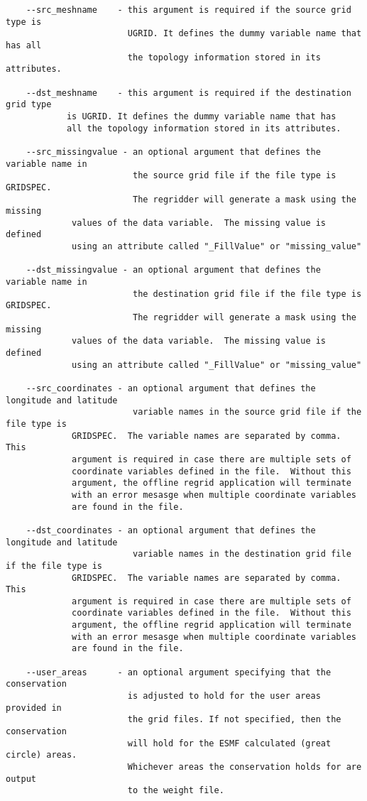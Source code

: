 \begin{verbatim}
    --src_meshname    - this argument is required if the source grid type is
                        UGRID. It defines the dummy variable name that has all 
                        the topology information stored in its attributes.

    --dst_meshname    - this argument is required if the destination grid type 
			is UGRID. It defines the dummy variable name that has 
			all the topology information stored in its attributes.

    --src_missingvalue - an optional argument that defines the variable name in
                         the source grid file if the file type is GRIDSPEC. 
                         The regridder will generate a mask using the missing 
			 values of the data variable.  The missing value is defined
			 using an attribute called "_FillValue" or "missing_value"

    --dst_missingvalue - an optional argument that defines the variable name in
                         the destination grid file if the file type is GRIDSPEC. 
                         The regridder will generate a mask using the missing 
			 values of the data variable.  The missing value is defined
			 using an attribute called "_FillValue" or "missing_value"

    --src_coordinates - an optional argument that defines the longitude and latitude
                         variable names in the source grid file if the file type is 
			 GRIDSPEC.  The variable names are separated by comma.  This
			 argument is required in case there are multiple sets of
			 coordinate variables defined in the file.  Without this
			 argument, the offline regrid application will terminate
			 with an error mesasge when multiple coordinate variables
			 are found in the file.

    --dst_coordinates - an optional argument that defines the longitude and latitude
                         variable names in the destination grid file if the file type is 
			 GRIDSPEC.  The variable names are separated by comma.  This
			 argument is required in case there are multiple sets of
			 coordinate variables defined in the file.  Without this
			 argument, the offline regrid application will terminate
			 with an error mesasge when multiple coordinate variables
			 are found in the file.

    --user_areas      - an optional argument specifying that the conservation
                        is adjusted to hold for the user areas provided in 
                        the grid files. If not specified, then the conservation
                        will hold for the ESMF calculated (great circle) areas. 
                        Whichever areas the conservation holds for are output
                        to the weight file. 
\end{verbatim}


